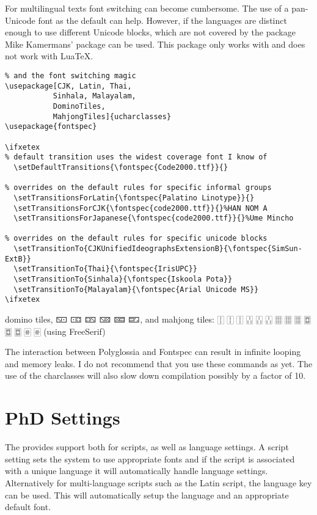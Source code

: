For multilingual texts font switching can become cumbersome. The use of a pan-Unicode font as the default can help. However, if the languages are distinct enough to use different Unicode blocks, which are not covered by the  package Mike Kamermans' package  can be used. This package only works with \xelatex and does not work with LuaTeX. 

\begin{verbatim}
% and the font switching magic
\usepackage[CJK, Latin, Thai, 
           Sinhala, Malayalam, 
           DominoTiles, 
           MahjongTiles]{ucharclasses}
\usepackage{fontspec}

\ifxetex
% default transition uses the widest coverage font I know of
  \setDefaultTransitions{\fontspec{Code2000.ttf}}{}

% overrides on the default rules for specific informal groups
  \setTransitionsForLatin{\fontspec{Palatino Linotype}}{}
  \setTransitionsForCJK{\fontspec{code2000.ttf}}{}%HAN NOM A
  \setTransitionsForJapanese{\fontspec{code2000.ttf}}{}%Ume Mincho

% overrides on the default rules for specific unicode blocks
  \setTransitionTo{CJKUnifiedIdeographsExtensionB}{\fontspec{SimSun-ExtB}}
  \setTransitionTo{Thai}{\fontspec{IrisUPC}}
  \setTransitionTo{Sinhala}{\fontspec{Iskoola Pota}}
  \setTransitionTo{Malayalam}{\fontspec{Arial Unicode MS}}
\ifxetex
\end{verbatim}

{
\newfontfamily{}
domino tiles, 🁇 🀼 🁐 🁋 🁚 🁝, and mahjong tiles: 🀑 🀑 🀑 🀒 🀒 🀒 🀕 🀕 🀕 🀗 🀗 🀗 🀅 🀅 (using FreeSerif)

}

The interaction between Polyglossia and Fontspec can result in infinite looping and memory leaks. I do not recommend that you use these commands as yet. The use of the charclasses will also slow down compilation possibly by a factor of 10.



\section{PhD Settings}

The  provides support both for scripts, as well as language settings. A script setting sets the system to use appropriate fonts and if the script is associated with a unique language it will automatically handle language settings. Alternatively for multi-language scripts such as the Latin script, the language key can be used. This will automatically setup the language and an appropriate default font. 

